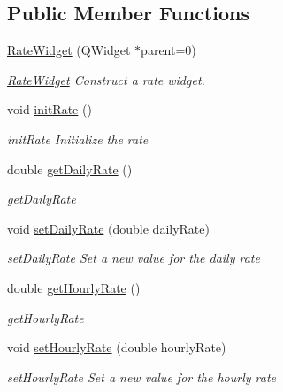 \subsection*{Public Member Functions}
\begin{DoxyCompactItemize}
\item 
\hyperlink{classRateWidget_ad1cb6a97e47b408043e83708ff8af15e}{Rate\+Widget} (Q\+Widget $\ast$parent=0)
\begin{DoxyCompactList}\small\item\em \hyperlink{classRateWidget}{Rate\+Widget} Construct a rate widget. \end{DoxyCompactList}\item 
\hypertarget{classRateWidget_a4a3ec9a546055d6ecb3bd1a9ee8082a6}{void \hyperlink{classRateWidget_a4a3ec9a546055d6ecb3bd1a9ee8082a6}{init\+Rate} ()}\label{classRateWidget_a4a3ec9a546055d6ecb3bd1a9ee8082a6}

\begin{DoxyCompactList}\small\item\em init\+Rate Initialize the rate \end{DoxyCompactList}\item 
double \hyperlink{classRateWidget_a0a72cea5ff524b47e513dcb21aea2022}{get\+Daily\+Rate} ()
\begin{DoxyCompactList}\small\item\em get\+Daily\+Rate \end{DoxyCompactList}\item 
void \hyperlink{classRateWidget_a8a3bccabb5c33e9f617ed85a68398b5a}{set\+Daily\+Rate} (double daily\+Rate)
\begin{DoxyCompactList}\small\item\em set\+Daily\+Rate Set a new value for the daily rate \end{DoxyCompactList}\item 
double \hyperlink{classRateWidget_a50285d4472979e004c706ff5640e8227}{get\+Hourly\+Rate} ()
\begin{DoxyCompactList}\small\item\em get\+Hourly\+Rate \end{DoxyCompactList}\item 
void \hyperlink{classRateWidget_a8135738c8a54389110de6751d9e2728e}{set\+Hourly\+Rate} (double hourly\+Rate)
\begin{DoxyCompactList}\small\item\em set\+Hourly\+Rate Set a new value for the hourly rate \end{DoxyCompactList}\end{DoxyCompactItemize}


